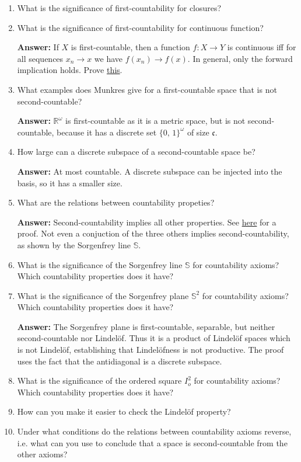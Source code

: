 \begin{enumerate}
    \item What is the significance of first-countability for closures?
    \item What is the significance of first-countability for continuous function?

    \textbf{Answer:} If \( X \) is first-countable, then a function \( f: X \to Y \) is continuous iff for all sequences \( x_n \to x \) we have \( f(x_n) \to f(x) \). In general, only the forward implication holds. Prove \hyperlink{FirstCountableContinuousFunctions}{this}.
    
    \item What examples does Munkres give for a first-countable space that is not second-countable?

        \textbf{Answer:} \( \mathbb{R}^\omega \) is first-countable as it is a metric space, but is not second-countable, because it has a discrete set \( \{ 0,\,1 \}^\omega \) of size \( \mathfrak{c} \).
    \item How large can a discrete subspace of a second-countable space be?
    
    \textbf{Answer:} At most countable. A discrete subspace can be injected into the basis, so it has a smaller size.
    \item What are the relations between countability propeties?

    \textbf{Answer:} Second-countability implies all other properties. See \hyperlink{MetrisableSpaceCountabilityProperties}{here} for a proof. Not even a conjuction of the three others implies second-countability, as shown by the Sorgenfrey line \( \mathbb{S} \).
    \item What is the significance of the Sorgenfrey line \( \mathbb{S} \) for countability axioms? Which countability properties does it have?
    \item What is the significance of the Sorgenfrey plane \( \mathbb{S}^2 \) for countability axioms? Which countability properties does it have?

        \textbf{Answer:}  The Sorgenfrey plane is first-countable, separable, but neither second-countable nor Lindel\"of. Thus it is a product of Lindel\"of spaces which is not Lindel\"of, establishing that Lindel\"ofness is not productive. The proof uses the fact that the antidiagonal is a discrete subspace.

    \item What is the significance of the ordered square \( I_o^2 \) for countability axioms? Which countability properties does it have?
    \item How can you make it easier to check the Lindel\"of property?
    \item Under what conditions do the relations between countability axioms reverse, i.e. what can you use to conclude that a space is second-countable from the other axioms?
\end{enumerate}

